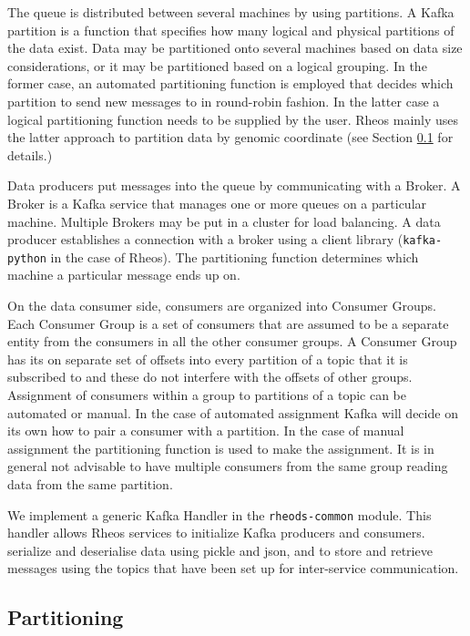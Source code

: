 The queue is distributed between several machines by using partitions. A Kafka partition is a function that specifies how many logical and physical partitions of the data exist. Data may be partitioned onto several machines based on data size considerations, or it may be partitioned based on a logical grouping. In the former case, an automated partitioning function is employed that decides which partition to send new messages to in round-robin fashion. In the latter case a logical partitioning function needs to be supplied by the user. Rheos mainly uses the latter approach to partition data by genomic coordinate (see Section \ref{sec:main_body_partitioning} for details.)

Data producers put messages into the queue by communicating with a Broker. A Broker is a Kafka service that manages one or more queues on a particular machine. Multiple Brokers may be put in a cluster for load balancing. A data producer establishes a connection with a broker using a client library (\texttt{kafka-python} in the case of Rheos). The partitioning function determines which machine a particular message ends up on.

On the data consumer side, consumers are organized into Consumer Groups. Each Consumer Group is a set of consumers that are assumed to be a separate entity from the consumers in all the other consumer groups. A Consumer Group has its on separate set of offsets into every partition of a topic that it is subscribed to and these do not interfere with the offsets of other groups. Assignment of consumers within a group to partitions of a topic can be automated or manual. In the case of automated assignment Kafka will decide on its own how to pair a consumer with a partition. In the case of manual assignment the partitioning function is used to make the assignment. It is in general not advisable to have multiple consumers from the same group reading data from the same partition. 

We implement a generic Kafka Handler in the \texttt{rheods-common} module. This handler allows Rheos services to initialize Kafka producers and consumers. serialize and deserialise data using pickle and json, and to store and retrieve messages using the topics that have been set up for inter-service communication.

\subsection{Partitioning} \label{sec:main_body_partitioning}

